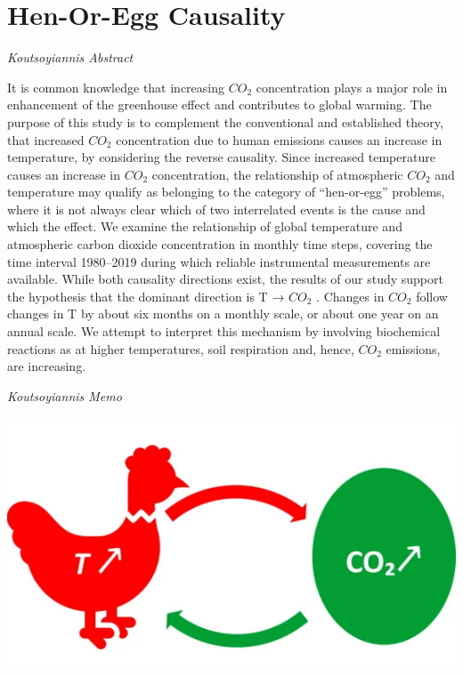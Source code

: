 \documentclass[
]{book}
\begin{document}
\hypertarget{hen-or-egg-causality}{%
\section{Hen-Or-Egg Causality}\label{hen-or-egg-causality}}

\emph{Koutsoyiannis Abstract}

It is common knowledge that increasing \(CO_2\) concentration plays a major role in
enhancement of the greenhouse effect and contributes to global warming. The purpose of this
study is to complement the conventional and established theory, that increased \(CO_2\) concentration
due to human emissions causes an increase in temperature, by considering the reverse causality.
Since increased temperature causes an increase in \(CO_2\) concentration, the relationship of atmospheric
\(CO_2\) and temperature may qualify as belonging to the category of ``hen-or-egg'' problems, where it is
not always clear which of two interrelated events is the cause and which the effect. We examine the
relationship of global temperature and atmospheric carbon dioxide concentration in monthly time
steps, covering the time interval 1980--2019 during which reliable instrumental measurements are
available. While both causality directions exist, the results of our study support the hypothesis that
the dominant direction is T → \(CO_2\) . Changes in \(CO_2\) follow changes in T by about six months on
a monthly scale, or about one year on an annual scale. We attempt to interpret this mechanism by
involving biochemical reactions as at higher temperatures, soil respiration and, hence, \(CO_2\) emissions,
are increasing.

\emph{Koutsoyiannis Memo}

\includegraphics{fig/hen-or-egg.png}
\end{document}
